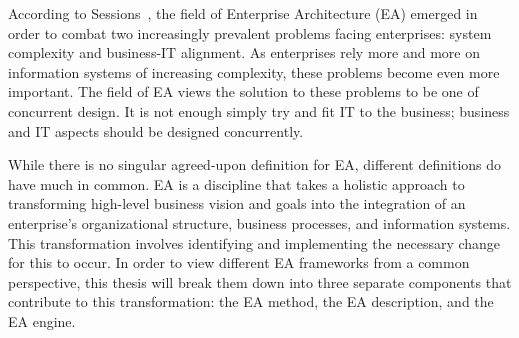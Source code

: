 



According to Sessions~\cite{sessions2007}, the field of Enterprise Architecture (EA) emerged in order to combat two increasingly prevalent problems facing enterprises: system complexity and business-IT alignment. As enterprises rely more and more on information systems of increasing complexity, these problems become even more important. The field of EA views the solution to these problems to be one of concurrent design. It is not enough simply try and fit IT to the business; business and IT aspects should be designed concurrently. 

While there is no singular agreed-upon definition for EA, different definitions\cite{jungle2004,GartnerInc,ross2006,pearlson2009,lankhorst2009,sessions2007,togaf9.1} do have much in common. EA is a discipline that takes a holistic approach to transforming high-level business vision and goals into the integration of an enterprise's organizational structure, business processes, and information systems. This transformation involves identifying and implementing the necessary change for this to occur. In order to view different EA frameworks from a common perspective, this thesis will break them down into three separate components that contribute to this transformation: the EA method, the EA description, and the EA engine. 

